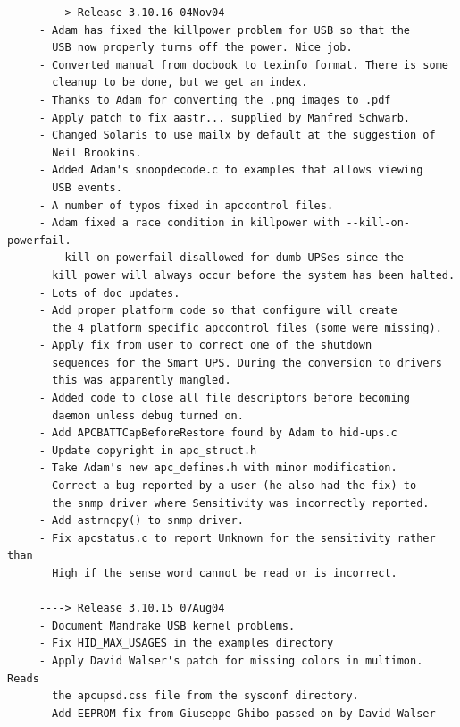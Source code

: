 \footnotesize
\begin{verbatim}
     ----> Release 3.10.16 04Nov04
     - Adam has fixed the killpower problem for USB so that the
       USB now properly turns off the power. Nice job.
     - Converted manual from docbook to texinfo format. There is some
       cleanup to be done, but we get an index.
     - Thanks to Adam for converting the .png images to .pdf
     - Apply patch to fix aastr... supplied by Manfred Schwarb.
     - Changed Solaris to use mailx by default at the suggestion of
       Neil Brookins.
     - Added Adam's snoopdecode.c to examples that allows viewing
       USB events.
     - A number of typos fixed in apccontrol files.
     - Adam fixed a race condition in killpower with --kill-on-powerfail.
     - --kill-on-powerfail disallowed for dumb UPSes since the
       kill power will always occur before the system has been halted.
     - Lots of doc updates.
     - Add proper platform code so that configure will create
       the 4 platform specific apccontrol files (some were missing).
     - Apply fix from user to correct one of the shutdown
       sequences for the Smart UPS. During the conversion to drivers
       this was apparently mangled.
     - Added code to close all file descriptors before becoming
       daemon unless debug turned on.
     - Add APCBATTCapBeforeRestore found by Adam to hid-ups.c
     - Update copyright in apc_struct.h
     - Take Adam's new apc_defines.h with minor modification.
     - Correct a bug reported by a user (he also had the fix) to
       the snmp driver where Sensitivity was incorrectly reported.
     - Add astrncpy() to snmp driver.
     - Fix apcstatus.c to report Unknown for the sensitivity rather than
       High if the sense word cannot be read or is incorrect.
     
     ----> Release 3.10.15 07Aug04
     - Document Mandrake USB kernel problems.
     - Fix HID_MAX_USAGES in the examples directory
     - Apply David Walser's patch for missing colors in multimon.  Reads
       the apcupsd.css file from the sysconf directory.
     - Add EEPROM fix from Giuseppe Ghibo passed on by David Walser
     

\end{verbatim}
